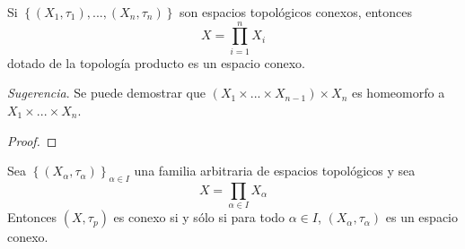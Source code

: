 \documentclass[12pt]{report}
\theoremstyle{largebreak}
\begin{document}
    \begin{excer}
        Si $\left\{(X_1,\tau_1),...,(X_n,\tau_n)\right\}$ son espacios topológicos conexos, entonces
        \begin{equation*}
            X=\prod_{ i=1}^n X_i
        \end{equation*}
        dotado de la topología producto es un espacio conexo.
        
        \textit{Sugerencia}. Se puede demostrar que $(X_1\times...\times X_{ n-1})\times X_n$ es homeomorfo a $X_1\times...\times X_n$.
    \end{excer}

    \begin{proof}
        
    \end{proof}

    \begin{propo}
        Sea $\left\{(X_\alpha,\tau_\alpha)\right\}_{\alpha\in I}$ una familia arbitraria de espacios topológicos y sea
        \begin{equation*}
            X=\prod_{\alpha\in I}X_\alpha
        \end{equation*}
        Entonces $(X,\tau_p)$ es conexo si y sólo si para todo $\alpha\in I$, $(X_\alpha,\tau_\alpha)$ es un espacio conexo.
    \end{propo}
\end{document}
